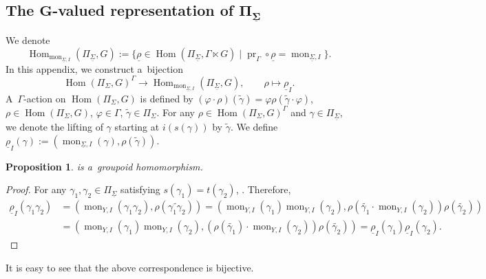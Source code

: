 \documentclass[10pt,a4paper]{amsart}
\numberwithin{equation}{section}
\newtheorem{Proposition}[Theorem]{Proposition}
\theoremstyle{definition}
\newcommand{\Hom}{\operatorname{Hom}}
\newcommand{\mon}{\operatorname{mon}}
\newcommand{\pr}{\operatorname{pr}}
\begin{document}
\subsection[The G-valued representation of Pi\_Sigma]{The $\boldsymbol{G}$-valued representation of $\boldsymbol{\Pi_{\underline{\Sigma}}}$}

We denote
\[
\Hom_{\mon_{\underline{\Sigma},I}}(\Pi_{\underline{\Sigma}},G) := \{\underline{\rho} \in \Hom(\Pi_{\underline{\Sigma}}, \Gamma \ltimes G)\mid \pr_{\Gamma} \circ \underline{\rho} = \mon_{\underline{\Sigma},I}\}.
\]
In this appendix, we construct a~bijection
\[
\Hom(\Pi_{\Sigma},G)^{\Gamma} \to \Hom_{\mon_{\underline{\Sigma},I}}(\Pi_{\underline{\Sigma}},G), \qquad \rho \mapsto \underline{\rho}_I.
\]
 A~$\Gamma$-action on $\Hom(\Pi_{\Sigma},G)$ is defined by
$
(\varphi \cdot \rho)(\tilde{\gamma}) = \varphi \rho(\tilde{\gamma}\cdot\varphi) $, $ \rho \in \Hom(\Pi_{\Sigma},G)$, $ \varphi \in \Gamma$, $ \tilde{\gamma} \in \Pi_{\Sigma}$.
For any $\rho \in \Hom(\Pi_{\Sigma},G)^{\Gamma}$ and $\gamma \in \Pi_{\underline{\Sigma}}$, we denote the lifting of $\gamma$ starting at $i(s(\gamma))$ by $\tilde{\gamma}$.
We define $\underline{\rho}_{I}(\gamma) := (\mon_{\underline{\Sigma},I}(\gamma),\rho(\tilde{\gamma}))$.

\begin{Proposition}
  is a~groupoid homomorphism.
\end{Proposition}

\begin{proof}
 For any $\gamma_1,\gamma_2 \in \Pi_{\underline{\Sigma}}$ satisfying $s(\gamma_1)=t(\gamma_2)$, \smash{$\widetilde{(\gamma_1 \gamma_2)} = (\tilde{\gamma_1}\cdot \mon_{Y,I}(\gamma_2))\tilde{\gamma_2}$}.
 Therefore,
 \begin{align*}
 \underline{\rho}_I(\gamma_1\gamma_2) &= (\mon_{Y,I}(\gamma_1 \gamma_2), \rho(\widetilde{\gamma_1 \gamma_2}))
 = (\mon_{Y,I}(\gamma_1) \mon_{Y,I}(\gamma_2), \rho(\tilde{\gamma_1}\cdot\mon_{Y,I}(\gamma_2))\rho(\tilde{\gamma_2})) \\
 &= (\mon_{Y,I}(\gamma_1) \mon_{Y,I}(\gamma_2), (\rho(\tilde{\gamma_1}) \cdot \mon_{Y,I}(\gamma_2)) \rho(\tilde{\gamma_2}))
 = \underline{\rho}_{I}(\gamma_1) \underline{\rho}_{I}(\gamma_2).\tag*{\qed}
 \end{align*} \renewcommand{\qed}{}
\end{proof}

It is easy to see that the above correspondence is bijective.
\end{document}
